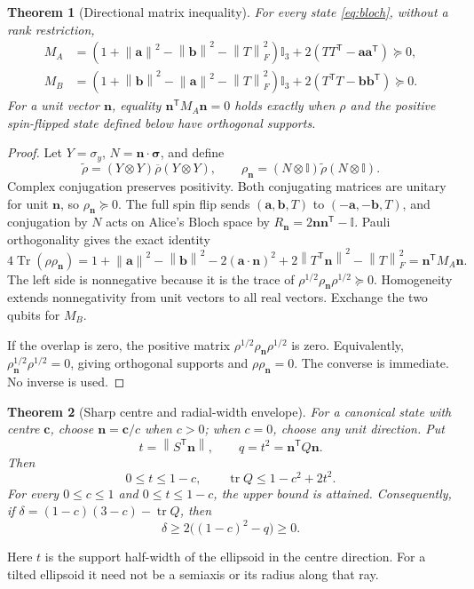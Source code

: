 \documentclass[11pt,a4paper]{article}
\newtheorem{theorem}{Theorem}
\theoremstyle{remark}\newtheorem{remark}[theorem]{Remark}
\newcommand{\Tr}{\operatorname{Tr}}
\newcommand{\tr}{\operatorname{tr}}
\newcommand{\Id}{\mathbb I}
\newcommand{\norm}[1]{\left\lVert#1\right\rVert}
\newcommand{\bs}{\boldsymbol\sigma}
\renewcommand{\aa}{\mathbf a}\newcommand{\bb}{\mathbf b}
\newcommand{\cc}{\mathbf c}\newcommand{\nn}{\mathbf n}
\begin{document}
\begin{theorem}[Directional matrix inequality]\label{thm:lmi}
For every state \eqref{eq:bloch}, without a rank restriction,
\begin{align}
M_A&=(1+\norm\aa^2-\norm\bb^2-\norm T_F^2)\Id_3
+2(TT^{\mathsf T}-\aa\aa^{\mathsf T})\succeq0,\label{eq:lmi}\\
M_B&=(1+\norm\bb^2-\norm\aa^2-\norm T_F^2)\Id_3
+2(T^{\mathsf T}T-\bb\bb^{\mathsf T})\succeq0.
\end{align}
For a unit vector $\nn$, equality $\nn^{\mathsf T}M_A\nn=0$ holds exactly when
$\rho$ and the positive spin-flipped state defined below have orthogonal supports.
\end{theorem}
\begin{proof}
Let $Y=\sigma_y$, $N=\nn\cdot\bs$, and define
\[
\widetilde\rho=(Y\otimes Y)\overline\rho(Y\otimes Y),\qquad
\rho_{\nn}=(N\otimes\Id)\widetilde\rho(N\otimes\Id).
\]
Complex conjugation preserves positivity. Both conjugating matrices are
unitary for unit $\nn$, so $\rho_{\nn}\succeq0$. The full spin flip sends
$(\aa,\bb,T)$ to $(-\aa,-\bb,T)$, and conjugation by $N$ acts on Alice's
Bloch space by $R_{\nn}=2\nn\nn^{\mathsf T}-\Id$. Pauli orthogonality gives
the exact identity
\begin{equation}\label{eq:overlap}
4\Tr(\rho\rho_{\nn})=1+\norm\aa^2-\norm\bb^2
-2(\aa\cdot\nn)^2+2\norm{T^{\mathsf T}\nn}^2-\norm T_F^2
=\nn^{\mathsf T}M_A\nn.
\end{equation}
The left side is nonnegative because it is the trace of
$\rho^{1/2}\rho_{\nn}\rho^{1/2}\succeq0$. Homogeneity extends nonnegativity
from unit vectors to all real vectors. Exchange the two qubits for $M_B$.

If the overlap is zero, the positive matrix
$\rho^{1/2}\rho_{\nn}\rho^{1/2}$ is zero. Equivalently,
$\rho_{\nn}^{1/2}\rho^{1/2}=0$, giving orthogonal supports and
$\rho\rho_{\nn}=0$. The converse is immediate. No inverse is used.
\end{proof}

\begin{theorem}[Sharp centre and radial-width envelope]\label{thm:radial}
For a canonical state with centre $\cc$, choose $\nn=\cc/c$ when $c>0$;
when $c=0$, choose any unit direction. Put
\[
t=\norm{S^{\mathsf T}\nn},\qquad q=t^2=\nn^{\mathsf T}Q\nn.
\]
Then
\begin{equation}\label{eq:radial}
0\leq t\leq1-c,\qquad \tr Q\leq1-c^2+2t^2.
\end{equation}
For every $0\leq c\leq1$ and $0\leq t\leq1-c$, the upper bound is attained.
Consequently, if
$\delta=(1-c)(3-c)-\tr Q$, then
\begin{equation}\label{eq:radialgap}
\delta\geq2\big((1-c)^2-q\big)\geq0.
\end{equation}
\end{theorem}
Here $t$ is the support half-width of the ellipsoid in the centre direction.
For a tilted ellipsoid it need not be a semiaxis or its radius along that ray.
\end{document}
